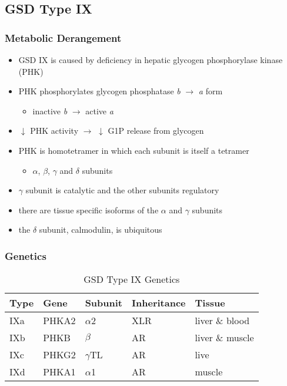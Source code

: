 \documentclass{scrartcl}
\begin{document}
\subsection{GSD Type IX}
\label{sec:org202e0d4}
\subsubsection{Metabolic Derangement}
\label{sec:org2b07f8c}
\begin{itemize}
\item GSD IX is caused by deficiency in hepatic glycogen phosphorylase kinase (PHK)
\item PHK phosphorylates glycogen phosphatase \emph{b} \(\to\) \emph{a} form
\begin{itemize}
\item inactive \emph{b} \(\to\)  active \emph{a}
\end{itemize}
\item \(\downarrow\) PHK activity \(\to\) \(\downarrow\) G1P release from glycogen
\item PHK is homotetramer in which each subunit is itself a tetramer
\begin{itemize}
\item \(\alpha\), \(\beta\), \(\gamma\) and \(\delta\) subunits
\end{itemize}
\item \(\gamma\) subunit is catalytic and the other subunits regulatory
\item there are tissue specific isoforms of the \(\alpha\) and \(\gamma\) subunits
\item the \(\delta\) subunit, calmodulin, is ubiquitous
\end{itemize}

\subsubsection{Genetics}
\label{sec:orgc608017}
\begin{table}[htbp]
\caption{\label{tab:orgc08a351}
GSD Type IX Genetics}
\centering
\begin{tabular}{lllll}
Type & Gene & Subunit & Inheritance & Tissue\\
\hline
IXa & PHKA2 & \(\alpha\)2 & XLR & liver \& blood\\
IXb & PHKB & \(\beta\) & AR & liver \& muscle\\
IXc & PHKG2 & \(\gamma\)TL & AR & live\\
IXd & PHKA1 & \(\alpha\)1 & AR & muscle\\
\end{tabular}
\end{table}
\end{document}
